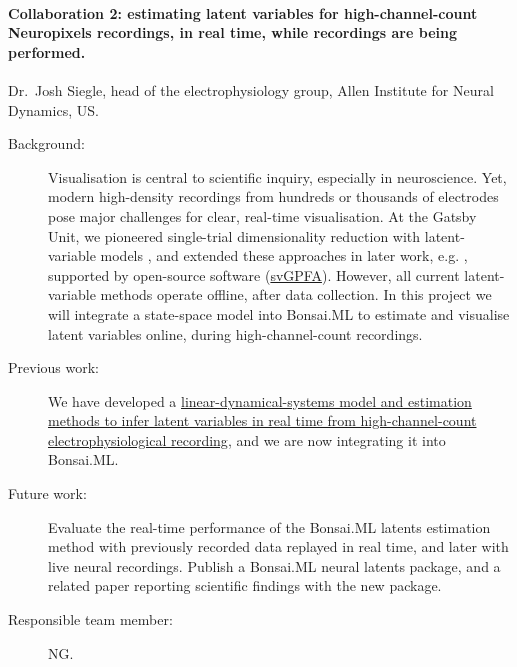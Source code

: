 \paragraph{Collaboration 2: estimating latent variables for high-channel-count
Neuropixels recordings, in real time, while recordings are being performed.}
Dr.~Josh Siegle, head of the electrophysiology group, Allen Institute for
Neural Dynamics, US.

\begin{description}

    \item[Background:] Visualisation is central to scientific inquiry,
        especially in neuroscience. Yet, modern high-density recordings from
        hundreds or thousands of electrodes pose major challenges for clear,
        real-time visualisation. At the Gatsby Unit, we pioneered single-trial
        dimensionality reduction with latent-variable models \citep{yuEtAl09},
        and extended these approaches in later work, e.g.
        \citep{dunckerAndSahani18}, supported by open-source software
        (\href{https://github.com/joacorapela/svGPFA}{svGPFA}). However, all
        current latent-variable methods operate offline, after data collection.
        In this project we will integrate a state-space model into Bonsai.ML to
        estimate and visualise latent variables online, during
        high-channel-count recordings.

    \item[Previous work:] We have developed a
        \href{https://joacorapela.github.io/ssm/auto_examples/neuralLatents/plot_MC_MAZE_SMALL.html#sphx-glr-auto-examples-neurallatents-plot-mc-maze-small-py}{linear-dynamical-systems
        model and estimation methods to infer latent variables in real time
        from high-channel-count electrophysiological recording}, and we are now
        integrating it into Bonsai.ML.


    \item[Future work:] Evaluate the real-time performance of the Bonsai.ML
        latents estimation method with previously recorded data replayed in
        real time, and later with live neural recordings. Publish a Bonsai.ML
        neural latents package, and a related paper reporting scientific
        findings with the new package.

    \item[Responsible team member:] NG.

\end{description}

